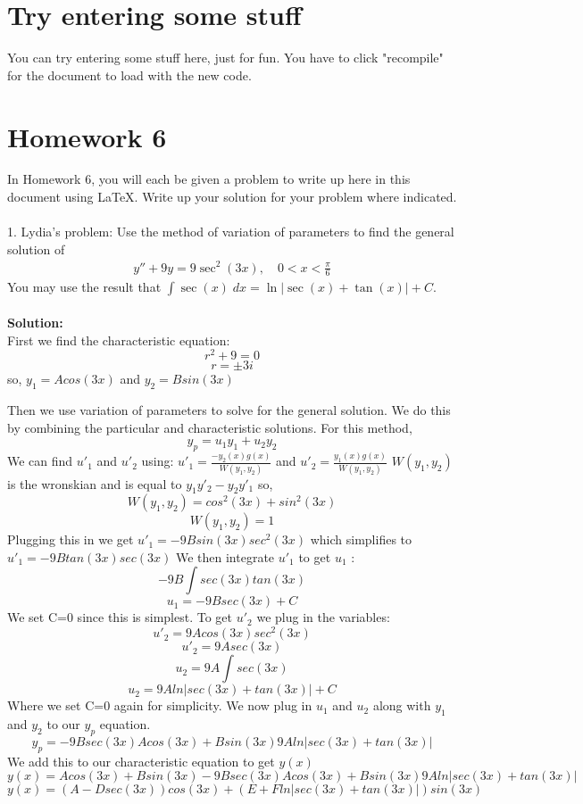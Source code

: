 \documentclass{article}
\begin{document}
\section{Try entering some stuff}
You can try entering some stuff here, just for fun. You have to click "recompile" for the document to load with the new code.
\newpage
\section{Homework 6}
In Homework 6, you will each be given a problem to write up here in this document using LaTeX. Write up your solution for your problem where indicated.
\\ \\
\hline 
\vspace{0.2in}
1. Lydia's problem: Use the method of variation of parameters to find the general solution of
\begin{align*}
y'' + 9y = 9 \sec^2(3x), \quad 0 < x < \frac{\pi}{6}
\end{align*}
You may use the result that $\int \sec(x) \; dx = \ln |\sec(x) + \tan(x)| + C$.\\ \\
\textbf{Solution:} \\
First we find the characteristic equation:
$$r^2+9=0$$
$$r=\pm3i$$
so, 
$y_1=Acos(3x)$  and  $y_2=Bsin(3x)$

Then we use variation of parameters to solve for the general solution. We do this by combining the particular and characteristic solutions. For this method, 
$$y_p=u_1y_1+u_2y_2$$
We can find $u'_1$ and $u'_2$ using:
$u'_1=\frac{-y_2(x)g(x)}{W(y_1,y_2)}$ and $u'_2=\frac{y_1(x)g(x)}{W(y_1,y_2)}$
$W(y_1,y_2)$ is the wronskian and is equal to $y_1y'_2-y_2y'_1$ so,
$$W(y_1,y_2)= cos^2(3x)+sin^2(3x)$$
$$W(y_1,y_2)=1$$
Plugging this in we get 
$u'_1=-9Bsin(3x)sec^2(3x)$ 
which simplifies to 
$u'_1=-9Btan(3x)sec(3x)$
We then integrate $u'_1$ to get $u_1$ :
$$-9B\int sec(3x)tan(3x)$$
$$u_1=-9Bsec(3x)+C$$ 
We set C=0 since this is simplest. 
To get $u'_2$ we plug in the variables:
$$u'_2=9Acos(3x)sec^2(3x)$$ 
$$u'_2=9Asec(3x)$$
$$u_2=9A\int sec(3x)$$
$$u_2=9Aln|sec(3x)+tan(3x)|+C$$
Where we set C=0 again for simplicity.
We now plug in $u_1$ and $u_2$ along with $y_1$ and $y_2$ to our $y_p$ equation.
$$y_p=-9Bsec(3x)Acos(3x)+Bsin(3x)9Aln|sec(3x)+tan(3x)|$$
We add this to our characteristic equation to get $y(x)$
$$y(x)=Acos(3x)+Bsin(3x)-9Bsec(3x)Acos(3x)+Bsin(3x)9Aln|sec(3x)+tan(3x)|$$
$$y(x)=(A-Dsec(3x))cos(3x)+(E+Fln|sec(3x)+tan(3x)|)sin(3x)$$
\end{document}
